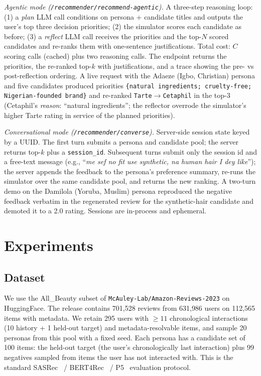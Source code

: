 \documentclass[8pt,twocolumn,a4paper]{extarticle}
\begin{document}
\textit{Agentic mode (\texttt{/recommender/recommend-agentic}).} A three-step reasoning loop: (1) a \emph{plan} LLM call conditions on persona + candidate titles and outputs the user's top three decision priorities; (2) the simulator scores each candidate as before; (3) a \emph{reflect} LLM call receives the priorities and the top-$N$ scored candidates and re-ranks them with one-sentence justifications. Total cost: $C$ scoring calls (cached) plus two reasoning calls. The endpoint returns the priorities, the re-ranked top-$k$ with justifications, and a trace showing the pre- vs post-reflection ordering. A live request with the Adaeze (Igbo, Christian) persona and five candidates produced priorities \texttt{\{natural ingredients; cruelty-free; Nigerian-founded brand\}} and re-ranked \texttt{Tarte}$\rightarrow$\texttt{Cetaphil} in the top-3 (Cetaphil's \emph{reason}: ``natural ingredients''; the reflector overrode the simulator's higher Tarte rating in service of the planned priorities).

\textit{Conversational mode (\texttt{/recommender/converse}).} Server-side session state keyed by a UUID. The first turn submits a persona and candidate pool; the server returns top-$k$ plus a \texttt{session\_id}. Subsequent turns submit only the session id and a free-text message (e.g., ``\emph{me sef no fit use synthetic, na human hair I dey like}''); the server appends the feedback to the persona's preference summary, re-runs the simulator over the same candidate pool, and returns the new ranking. A two-turn demo on the Damilola (Yoruba, Muslim) persona reproduced the negative feedback verbatim in the regenerated review for the synthetic-hair candidate and demoted it to a 2.0 rating. Sessions are in-process and ephemeral.

\section{Experiments}
\label{sec:exp}

\subsection{Dataset}

We use the All\_Beauty subset of \texttt{McAuley-Lab/Amazon-Reviews-2023} on HuggingFace. The release contains 701{,}528 reviews from 631{,}986 users on 112{,}565 items with metadata. We retain 295 users with $\geq 11$ chronological interactions (10 history + 1 held-out target) and metadata-resolvable items, and sample 20 personas from this pool with a fixed seed. Each persona has a candidate set of 100 items: the held-out target (the user's chronologically last interaction) plus 99 negatives sampled from items the user has not interacted with. This is the standard SASRec~\citep{kang2018sasrec} / BERT4Rec~\citep{sun2019bert4rec} / P5~\citep{geng2022p5} evaluation protocol.
\end{document}
